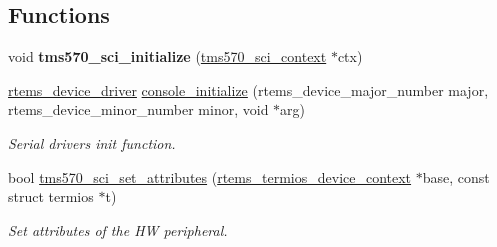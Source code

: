 \subsection*{Functions}
\begin{DoxyCompactItemize}
\item 
\mbox{\label{tms570-sci_8c_ae9a4d3192f3e78b9857788a98bb14187}} 
void {\bfseries tms570\+\_\+sci\+\_\+initialize} (\mbox{\hyperlink{structtms570__sci__context}{tms570\+\_\+sci\+\_\+context}} $\ast$ctx)
\item 
\mbox{\hyperlink{group__ClassicStatus_ga545d41846817eaba6143d52ee4d9e9fe}{rtems\+\_\+device\+\_\+driver}} \mbox{\hyperlink{tms570-sci_8c_aafa42e88bcc94ce0f507f77be54a90a6}{console\+\_\+initialize}} (rtems\+\_\+device\+\_\+major\+\_\+number major, rtems\+\_\+device\+\_\+minor\+\_\+number minor, void $\ast$arg)
\begin{DoxyCompactList}\small\item\em Serial drivers init function. \end{DoxyCompactList}\item 
bool \mbox{\hyperlink{tms570-sci_8c_a7cf94e3b205d7a61b8455d806ad96b67}{tms570\+\_\+sci\+\_\+set\+\_\+attributes}} (\mbox{\hyperlink{structrtems__termios__device__context}{rtems\+\_\+termios\+\_\+device\+\_\+context}} $\ast$base, const struct termios $\ast$t)
\begin{DoxyCompactList}\small\item\em Set attributes of the HW peripheral. \end{DoxyCompactList}\end{DoxyCompactItemize}
